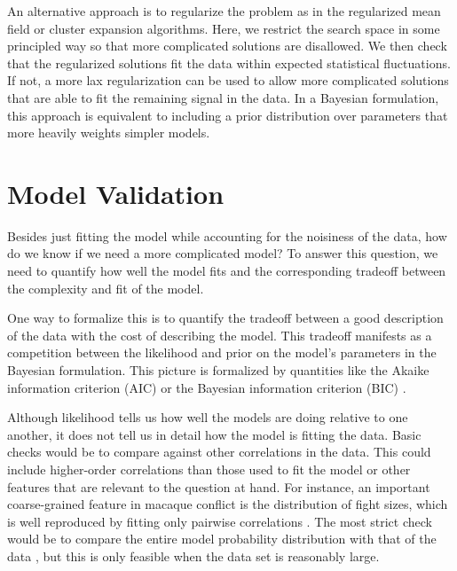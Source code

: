 \documentclass[aps,prl,twocolumn,nofootinbib]{revtex4-1}
\begin{document}
An alternative approach is to regularize the problem as in the regularized mean field or cluster expansion algorithms. Here, we restrict the search space in some principled way so that more complicated
solutions are disallowed.  We then check that the regularized solutions fit the
data within expected statistical fluctuations.  If not, a more lax regularization
can be used to allow more complicated solutions that are able to fit the
remaining signal in the data. 
In a Bayesian formulation, this approach is equivalent to including a prior distribution over  parameters that more heavily weights simpler models.

\section{Model Validation}
Besides just fitting the model while accounting for the noisiness of the data, how do we know if we need a more complicated model? To answer this question, we need to quantify how well the model fits and the corresponding tradeoff between the complexity and fit of the model.

One way to formalize this is to quantify the tradeoff between a good description of the data with the cost of describing the model. This tradeoff manifests as a competition between the likelihood and prior on the model's parameters in the Bayesian formulation.
This picture is formalized by quantities like the Akaike information criterion (AIC) or the Bayesian information criterion (BIC) \cite{Anonymous:mVL3xTtr}.

Although likelihood tells us how well the models are doing relative to one another, it does not tell us in detail how the model is fitting the data.
Basic checks would be to compare against other correlations in the data.  This could include higher-order correlations than those used to fit the model or other features that are relevant to the question at hand. For instance, an important coarse-grained feature in  macaque conflict is the distribution of fight sizes, which is well reproduced by fitting only pairwise correlations \cite{Daniels:2017cq}.
The most strict check would be to compare the entire model probability distribution with that of the data \cite{Lee:2015ev}, but this is only feasible when the data set is reasonably large.
\end{document}
